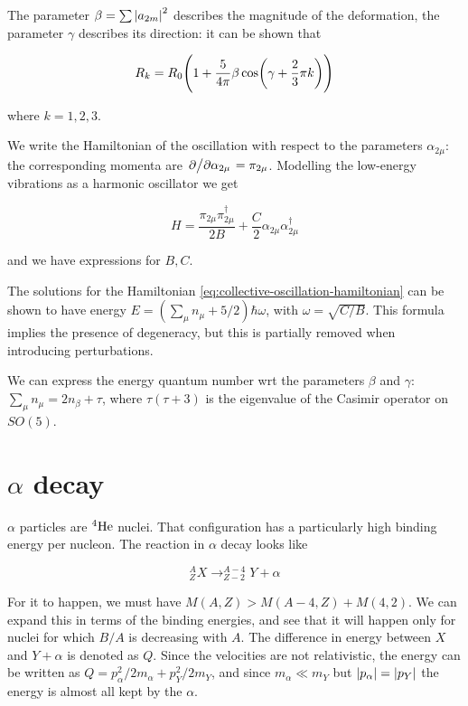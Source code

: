 \documentclass[main.tex]{subfiles}
\begin{document}
The parameter \(\beta = \sum  \abs{a_{2m}}^2  \) describes the magnitude of the deformation, the parameter \(\gamma\) describes its direction: it can be shown that

\begin{equation}
    R_k = R_0 \qty(1+\frac{5}{4 \pi} \beta \cos(\gamma + \frac{2}{3} \pi k) )
\end{equation}

where \(k = 1, 2, 3\).

We write the Hamiltonian of the oscillation with respect to the parameters \(\alpha_{2\mu}\): the corresponding momenta are \(\pdv*{}{\alpha_{2\mu}} = \pi_{2\mu}\). Modelling the low-energy vibrations as a harmonic oscillator we get

\begin{equation} \label{eq:collective-oscillation-hamiltonian}
    H = \frac{\pi_{2\mu} \pi_{2\mu}^\dag}{2B} + \frac{C}{2} \alpha_{2\mu} \alpha_{2\mu}^\dag
\end{equation}

and we have expressions for \(B, C\).

The solutions for the Hamiltonian \eqref{eq:collective-oscillation-hamiltonian} can be shown to have energy \(E = (\sum_\mu n_\mu + 5/2) \hbar \omega\), with \(\omega = \sqrt{C/B}\). This formula implies the presence of degeneracy, but this is partially removed when introducing perturbations.

We can express the energy quantum number wrt the parameters \(\beta\) and \(\gamma\): \(\sum _{\mu}  n_\mu = 2n_\beta + \tau \), where \(\tau (\tau+3)\) is the eigenvalue of the Casimir operator on \(SO(5)\).

\section{\(\alpha\) decay}

\(\alpha\) particles are \(^{4} \ce{He} \) nuclei. That configuration has a particularly high binding energy per nucleon. The reaction in \(\alpha\) decay looks like

\begin{equation}
    ^{A} _Z X \rightarrow ^{A-4} _{Z-2} Y + \alpha
\end{equation}

For it to happen, we must have \(M(A, Z) > M(A-4, Z) + M(4, 2)\). We can expand this in terms of the binding energies, and see that it will happen only for nuclei for which \(B/A\) is decreasing with \(A\). The difference in energy between \(X\) and \(Y + \alpha\) is denoted as \(Q\). Since the velocities are not relativistic, the energy can be written as \(Q = p_\alpha^2 /2m_\alpha + p_Y^2 /2m_Y\), and since \(m_\alpha \ll m_Y\) but \(\abs{p_\alpha} = \abs{p_Y}\) the energy is almost all kept by the \(\alpha\).
\end{document}
